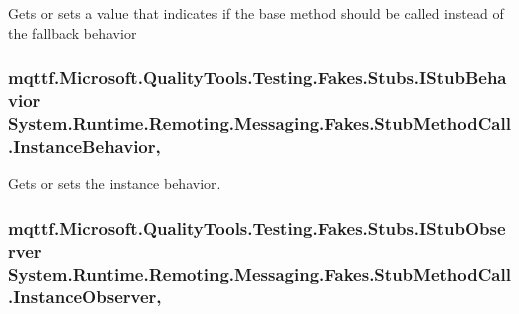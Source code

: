 Gets or sets a value that indicates if the base method should be called instead of the fallback behavior

\hypertarget{class_system_1_1_runtime_1_1_remoting_1_1_messaging_1_1_fakes_1_1_stub_method_call_a5edc7ee0b9630648cd67a5f2894ea66b}{
\subsubsection[{Instance\-Behavior}]{\setlength{\rightskip}{0pt plus 5cm}mqttf.\-Microsoft.\-Quality\-Tools.\-Testing.\-Fakes.\-Stubs.\-I\-Stub\-Behavior System.\-Runtime.\-Remoting.\-Messaging.\-Fakes.\-Stub\-Method\-Call.\-Instance\-Behavior\hspace{0.3cm}{\ttfamily [get]}, {\ttfamily [set]}}}\label{class_system_1_1_runtime_1_1_remoting_1_1_messaging_1_1_fakes_1_1_stub_method_call_a5edc7ee0b9630648cd67a5f2894ea66b}


Gets or sets the instance behavior.

\hypertarget{class_system_1_1_runtime_1_1_remoting_1_1_messaging_1_1_fakes_1_1_stub_method_call_a93209fb8f69bea4fddf6cb2dd669691c}{
\subsubsection[{Instance\-Observer}]{\setlength{\rightskip}{0pt plus 5cm}mqttf.\-Microsoft.\-Quality\-Tools.\-Testing.\-Fakes.\-Stubs.\-I\-Stub\-Observer System.\-Runtime.\-Remoting.\-Messaging.\-Fakes.\-Stub\-Method\-Call.\-Instance\-Observer\hspace{0.3cm}{\ttfamily [get]}, {\ttfamily [set]}}}\label{class_system_1_1_runtime_1_1_remoting_1_1_messaging_1_1_fakes_1_1_stub_method_call_a93209fb8f69bea4fddf6cb2dd669691c}


